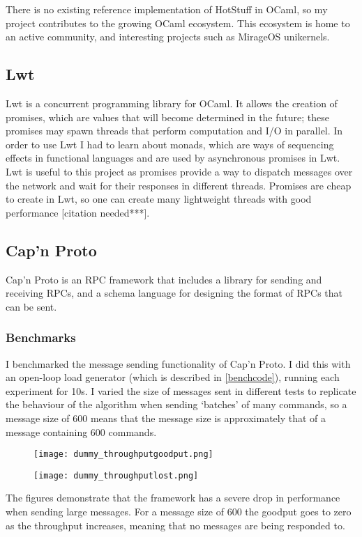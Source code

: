 There is no existing reference implementation of HotStuff in OCaml, so my project contributes to the growing OCaml ecosystem. This ecosystem is home to an active community, and interesting projects such as MirageOS unikernels.

\subsection{Lwt}
Lwt is a concurrent programming library for OCaml. It allows the creation of promises, which are values that will become determined in the future; these promises may spawn threads that perform computation and I/O in parallel. In order to use Lwt I had to learn about monads, which are ways of sequencing effects in functional languages and are used by asynchronous promises in Lwt. Lwt is useful to this project as promises provide a way to dispatch messages over the network and wait for their responses in different threads. Promises are cheap to create in Lwt, so one can create many lightweight threads with good performance [citation needed***].
\subsection{Cap'n Proto}
Cap'n Proto is an RPC framework that includes a library for sending and receiving RPCs, and a schema language for designing the format of RPCs that can be sent. 

\subsubsection{Benchmarks}
I benchmarked the message sending functionality of Cap'n Proto. I did this with an open-loop load generator (which is described in \ref{benchcode}), running each experiment for 10s. I varied the size of messages sent in different tests to replicate the behaviour of the algorithm when sending `batches' of many commands, so a message size of 600 means that the message size is approximately that of a message containing 600 commands.

\begin{figure}[h!]
\centering
\texttt{[image: dummy\_throughputgoodput.png]}
\end{figure}

\begin{figure}[h!]
\centering
\texttt{[image: dummy\_throughputlost.png]}
\end{figure}

The figures demonstrate that the framework has a severe drop in performance when sending large messages. For a message size of 600 the goodput goes to zero as the throughput increases, meaning that no messages are being responded to.

